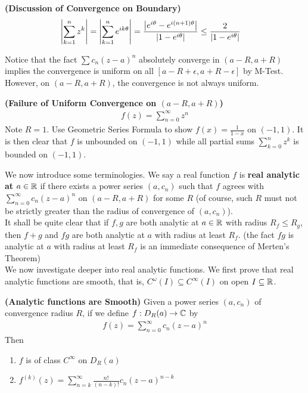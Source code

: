 \documentclass{report}
\begin{document}
\begin{mdframed}
\begin{Example}{\textbf{(Discussion of Convergence on Boundary)}}{}
\begin{align*}
\left|\sum_{k=1}^n z^k\right|&=\left|\sum_{k=1}^n e^{ik\theta}\right|=\frac{\left|e^{i\theta}-e^{i(n+1)\theta}\right|}{\left|1-e^{i\theta}\right|}\leq \frac{2}{\left|1-e^{i\theta}\right|}
\end{align*}
\end{Example}
Notice that the fact $\sum c_n(z-a)^n$ absolutely converge in $(a-R,a+R)$ implies the convergence is uniform on all $[a-R+\epsilon ,a+R-\epsilon ]$ by M-Test. However, on $(a-R,a+R)$, the convergence is not always uniform. 
\begin{Example}{\textbf{(Failure of Uniform Convergence on $(a-R,a+R)$)}}{}
\begin{align*}
f(z)=\sum_{n=0}^\infty z^n
\end{align*}
Note $R=1$. Use Geometric Series Formula to show $f(x)=\frac{1}{1-x}$ on $(-1,1)$. It is then clear that $f$ is unbounded on  $(-1,1)$ while all partial sums $\sum_{k=0}^n z^k$ is bounded on $(-1,1)$. 
\end{Example}
We now introduce some terminologies. We say a real function $f$ is \textbf{real analytic at} $a\in\mathbb{R}$ if there exists a power series $(a,c_n)$ such that $f$ agrees with $\sum_{n=0}^\infty c_n(z-a)^n$ on $(a-R,a+R)$ for some $R$  (of course, such $R$ must not be strictly greater than the radius of convergence of $(a,c_n)$).\\

It shall be quite clear that if $f,g$ are both analytic at  $a\in\mathbb{R}$ with radius $R_f\leq R_g$, then $f+g$ and $fg$ are both analytic at  $a$ with radius at least $R_f$. (the fact $fg$ is analytic at $a$ with radius at least $R_f$ is an immediate consequence of  Merten's Theorem)\\

We now investigate deeper into real analytic functions. We first prove that real analytic functions are smooth, that is,  $C^{\omega}(I)\subseteq C^{\infty}(I)$ on open $I\subseteq \mathbb{R}$. 
\end{mdframed}
\begin{theorem}
\label{AfaS}
\textbf{(Analytic functions are Smooth)} Given a power series $(a,c_n)$ of convergence radius $R$, if we define $f:D_R(a)\rightarrow \mathbb{C}$ by
\begin{align*}
f(z)=\sum _{n=0}^{\infty}c_n(z-a)^n 
\end{align*}
Then 
\begin{enumerate}[label=(\alph*)]
  \item $f$ is of class $C^{\infty}$ on $D_R(a)$ 
  \item $f^{(k)}(z)=\sum_{n=k}^{\infty}\frac{n!}{(n-k)!}c_n(z-a)^{n-k}$
\end{enumerate}
\end{theorem}
\end{document}
